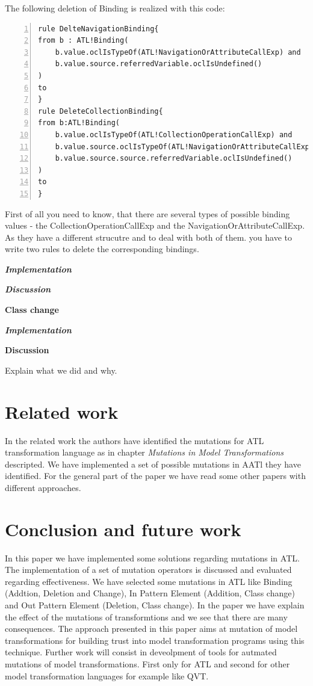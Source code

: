 \documentclass{llncs}
\begin{document}
The following deletion of Binding is realized with this code:
\begin{lstlisting}[language=ATL, numbers=left,xleftmargin=5.0ex]
rule DelteNavigationBinding{
from b : ATL!Binding(
	b.value.oclIsTypeOf(ATL!NavigationOrAttributeCallExp) and 
	b.value.source.referredVariable.oclIsUndefined()
)
to
}
rule DeleteCollectionBinding{
from b:ATL!Binding(		
	b.value.oclIsTypeOf(ATL!CollectionOperationCallExp) and 
	b.value.source.oclIsTypeOf(ATL!NavigationOrAttributeCallExp) and 
	b.value.source.source.referredVariable.oclIsUndefined()
)
to
}
\end{lstlisting}

First of all you need to know, that there are several types of possible binding values - the CollectionOperationCallExp and the NavigationOrAttributeCallExp.
As they have a different strucutre and to deal with both of them. you have to write two rules to delete the corresponding bindings.

\textbf\textit{{Implementation}}

\textbf\textit{{Discussion}}

\textbf{Class change}

\textbf\textit{{Implementation}}

\textbf{Discussion}

Explain what we did and why.

\section{Related work}
In the related work \cite{troya:2015} the authors have identified the mutations for ATL transformation language as in chapter \textit{Mutations in Model Transformations} descripted. We have implemented a set of possible mutations in AATl they have identified. For the general part of the paper we have read some other papers with different approaches.

\section{Conclusion and future work}
In this paper we have implemented some solutions regarding mutations in ATL. The implementation of a set of mutation operators is discussed and evaluated regarding effectiveness. We have selected some mutations in ATL like Binding (Addtion, Deletion and Change), In Pattern Element (Addition, Class change) and Out Pattern Element (Deletion, Class change). In the paper we have explain the effect of the mutations of transformtions and we see that there are many consequences. The approach presented in this paper aims at mutation of model transformations for building trust into model transformation programs using this technique. Further work will consist in deveolpment of tools for autmated mutations of model transformations. First only for ATL and second for other model transformation languages for example like QVT.
\end{document}
